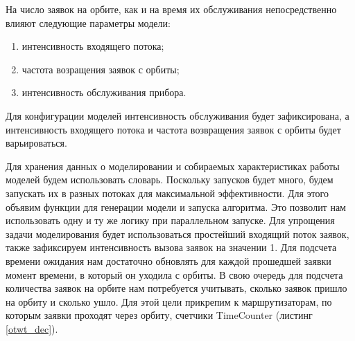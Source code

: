 На число заявок на орбите, как и на время их обслуживания непосредственно влияют следующие параметры модели:
\begin{enumerate}
	\item интенсивность входящего потока;
	\item частота возращения заявок с орбиты;
	\item интенсивность обслуживания прибора.
\end{enumerate} 

Для конфигурации моделей интенсивность обслуживания будет зафиксирована, а интенсивность входящего потока и частота возвращения заявок с орбиты будет варьироваться.

Для хранения данных о моделировании и собираемых характеристиках работы моделей будем использовать словарь. Поскольку запусков будет много, будем запускать их в разных потоках для максимальной эффективности. Для этого объявим функции для генерации модели и запуска алгоритма. Это позволит нам использовать одну и ту же логику при параллельном запуске. Для упрощения задачи моделирования будет использоваться простейший входящий поток заявок, также зафиксируем интенсивность вызова заявок на значении 1. Для подсчета времени ожидания нам достаточно обновлять для каждой прошедшей заявки момент времени, в который он уходила с орбиты. В свою очередь для подсчета количества заявок на орбите нам потребуется учитывать, сколько заявок пришло на орбиту и сколько ушло. Для этой цели прикрепим к маршрутизаторам, по которым заявки проходят через орбиту, счетчики TimeCounter (листинг \ref{otwt_dec}). 

